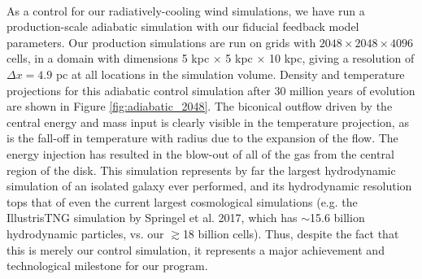 \documentclass[11pt,letterpaper,english]{article}
\begin{document}
~\\
As a control for our radiatively-cooling wind simulations, we have run a production-scale adiabatic simulation with our fiducial feedback model parameters. Our production simulations are run on grids with $2048\times2048\times4096$ cells, in a domain with dimensions 5 kpc $\times$ 5 kpc $\times$ 10 kpc, giving a resolution of $\Delta x=4.9$ pc at all locations in the simulation volume. Density and temperature projections for this adiabatic control simulation after 30 million years of evolution are shown in Figure \ref{fig:adiabatic_2048}. The biconical outflow driven by the central energy and mass input is clearly visible in the temperature projection, as is the fall-off in temperature with radius due to the expansion of the flow. The energy injection has resulted in the blow-out of all of the gas from the central region of the disk. This simulation represents by far the largest hydrodynamic simulation of an isolated galaxy ever performed, and its hydrodynamic resolution tops that of even the current largest cosmological simulations (e.g. the IllustrisTNG simulation by Springel et al. 2017, which has $\sim$15.6 billion hydrodynamic particles, vs. our $\gtrsim$18 billion cells). Thus, despite the fact that this is merely our control simulation, it represents a major achievement and technological milestone for our program.
\end{document}
